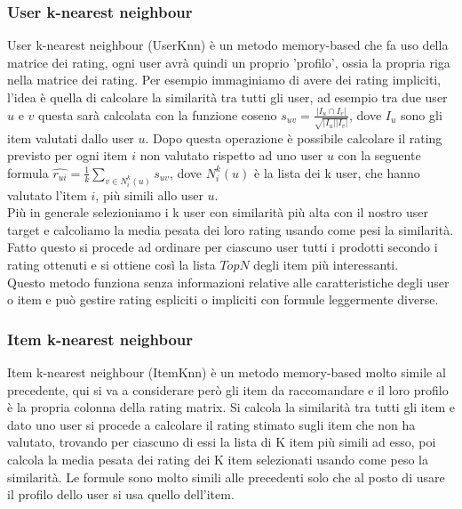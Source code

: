 \subsubsection{User k-nearest neighbour}
User k-nearest neighbour (UserKnn) è un metodo memory-based che fa uso della matrice dei rating, ogni user avrà quindi un proprio 'profilo', ossia la propria riga nella matrice dei rating. 
Per esempio immaginiamo di avere dei rating impliciti, l'idea è quella di calcolare la similarità tra tutti gli user, ad esempio tra due user $u$ e $v$ questa sarà calcolata con la funzione coseno $s_{uv} = \frac{|I_{u} \cap I_{v}|}{\sqrt{|I_{u}||I_{v}|}}$, dove $I_u$ sono gli item valutati dallo user $u$. Dopo questa operazione è possibile calcolare il rating previsto per ogni item $i$ non valutato rispetto ad uno user $u$ con la seguente formula $\hat{r_{ui}} = \frac{1}{k} \sum_{v\in N_{i}^k(u)} s_{uv}$, dove $N_{i}^k(u)$ è la lista dei k user, che hanno valutato l'item $i$, più simili allo user $u$.\\
Più in generale selezioniamo i k user con similarità più alta con il nostro user target e calcoliamo la media pesata dei loro rating usando come pesi la similarità.\\
Fatto questo si procede ad ordinare per ciascuno user tutti i prodotti secondo i rating ottenuti e si ottiene così la lista $TopN$ degli item più interessanti.\\
Questo metodo funziona senza informazioni relative alle caratteristiche degli user o item e può gestire rating espliciti o impliciti con formule leggermente diverse.

\subsubsection{Item k-nearest neighbour}
Item k-nearest neighbour (ItemKnn) è un metodo memory-based molto simile al precedente, qui si va a considerare però gli item da raccomandare e il loro profilo è la propria colonna della rating matrix. Si calcola la similarità tra tutti gli item e dato uno user si procede a calcolare il rating stimato sugli item che non ha valutato, trovando per ciascuno di essi la lista di K item più simili ad esso, poi calcola la media pesata dei rating dei K item selezionati usando come peso la similarità. Le formule sono molto simili alle precedenti solo che al posto di usare il profilo dello user si usa quello dell'item.
 
